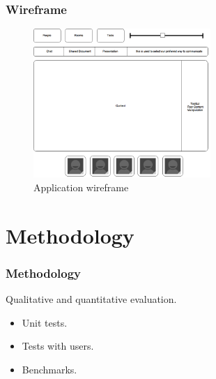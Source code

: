 \documentclass[t]{beamer}
\begin{document}
\begin{frame}[c]
		\frametitle{Wireframe}
		\begin{figure}[H]
			\includegraphics[width=0.6\textwidth]{figures/pbf.png}
			\caption{Application wireframe}
		\end{figure}
	\end{frame}

\section{Methodology}\label{meth} %

\begin{frame}[c]
		\frametitle{Methodology}
Qualitative and quantitative evaluation.

		\begin{itemize}
		\item Unit tests.
		\item Tests with users.
		\item Benchmarks.
		\end{itemize}
	\end{frame}
\end{document}
